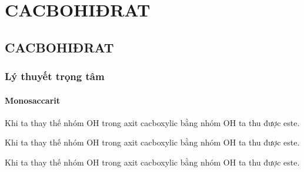 \newpage
\chapter{CACBOHIĐRAT}

\section{CACBOHIĐRAT}

\subsection{Lý thuyết trọng tâm}

\subsubsection{Monosaccarit}

\begin{kngsnd}
	Khi ta thay thế nhóm OH trong axit cacboxylic bằng nhóm OH ta thu được este.
	
\end{kngsnd}
\newpage
\begin{kngsnd}
	Khi ta thay thế nhóm OH trong axit cacboxylic bằng nhóm OH ta thu được este.
	
\end{kngsnd}

\newpage
\begin{kngsnd}
	Khi ta thay thế nhóm OH trong axit cacboxylic bằng nhóm OH ta thu được este.
	
\end{kngsnd}
